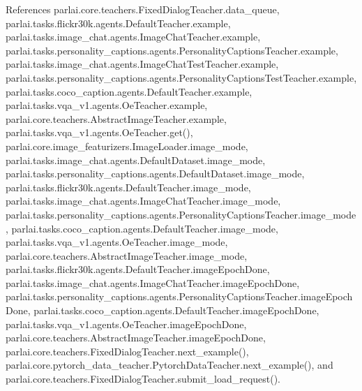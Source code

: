 References parlai.\+core.\+teachers.\+Fixed\+Dialog\+Teacher.\+data\+\_\+queue, parlai.\+tasks.\+flickr30k.\+agents.\+Default\+Teacher.\+example, parlai.\+tasks.\+image\+\_\+chat.\+agents.\+Image\+Chat\+Teacher.\+example, parlai.\+tasks.\+personality\+\_\+captions.\+agents.\+Personality\+Captions\+Teacher.\+example, parlai.\+tasks.\+image\+\_\+chat.\+agents.\+Image\+Chat\+Test\+Teacher.\+example, parlai.\+tasks.\+personality\+\_\+captions.\+agents.\+Personality\+Captions\+Test\+Teacher.\+example, parlai.\+tasks.\+coco\+\_\+caption.\+agents.\+Default\+Teacher.\+example, parlai.\+tasks.\+vqa\+\_\+v1.\+agents.\+Oe\+Teacher.\+example, parlai.\+core.\+teachers.\+Abstract\+Image\+Teacher.\+example, parlai.\+tasks.\+vqa\+\_\+v1.\+agents.\+Oe\+Teacher.\+get(), parlai.\+core.\+image\+\_\+featurizers.\+Image\+Loader.\+image\+\_\+mode, parlai.\+tasks.\+image\+\_\+chat.\+agents.\+Default\+Dataset.\+image\+\_\+mode, parlai.\+tasks.\+personality\+\_\+captions.\+agents.\+Default\+Dataset.\+image\+\_\+mode, parlai.\+tasks.\+flickr30k.\+agents.\+Default\+Teacher.\+image\+\_\+mode, parlai.\+tasks.\+image\+\_\+chat.\+agents.\+Image\+Chat\+Teacher.\+image\+\_\+mode, parlai.\+tasks.\+personality\+\_\+captions.\+agents.\+Personality\+Captions\+Teacher.\+image\+\_\+mode, parlai.\+tasks.\+coco\+\_\+caption.\+agents.\+Default\+Teacher.\+image\+\_\+mode, parlai.\+tasks.\+vqa\+\_\+v1.\+agents.\+Oe\+Teacher.\+image\+\_\+mode, parlai.\+core.\+teachers.\+Abstract\+Image\+Teacher.\+image\+\_\+mode, parlai.\+tasks.\+flickr30k.\+agents.\+Default\+Teacher.\+image\+Epoch\+Done, parlai.\+tasks.\+image\+\_\+chat.\+agents.\+Image\+Chat\+Teacher.\+image\+Epoch\+Done, parlai.\+tasks.\+personality\+\_\+captions.\+agents.\+Personality\+Captions\+Teacher.\+image\+Epoch\+Done, parlai.\+tasks.\+coco\+\_\+caption.\+agents.\+Default\+Teacher.\+image\+Epoch\+Done, parlai.\+tasks.\+vqa\+\_\+v1.\+agents.\+Oe\+Teacher.\+image\+Epoch\+Done, parlai.\+core.\+teachers.\+Abstract\+Image\+Teacher.\+image\+Epoch\+Done, parlai.\+core.\+teachers.\+Fixed\+Dialog\+Teacher.\+next\+\_\+example(), parlai.\+core.\+pytorch\+\_\+data\+\_\+teacher.\+Pytorch\+Data\+Teacher.\+next\+\_\+example(), and parlai.\+core.\+teachers.\+Fixed\+Dialog\+Teacher.\+submit\+\_\+load\+\_\+request().

